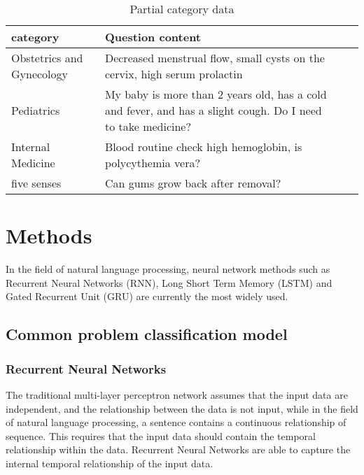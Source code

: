 \documentclass{article}
\begin{document}
\begin{table*}[h!]
    \caption{Partial category data}    
    \centering
    \begin{tabularx}{\textwidth}{lXXX}
            \hline
            category & Question content \\ \hline
            Obstetrics and Gynecology & Decreased menstrual flow, small cysts on the cervix, high serum prolactin \\
            Pediatrics & My baby is more than 2 years old, has a cold and fever, and has a slight cough. Do I need to take medicine?\\
            Internal Medicine & Blood routine check high hemoglobin, is polycythemia vera? \\five senses & Can gums grow back after removal?\\
            \hline
            \end{tabularx}
    \label{tab:2}
\end{table*}

\section{Methods}

In the field of natural language processing, neural network methods such as Recurrent Neural Networks (RNN), Long Short Term Memory (LSTM) and Gated Recurrent Unit (GRU) are currently the most widely used.

\subsection{Common problem classification model}
\subsubsection{Recurrent Neural Networks}
The traditional multi-layer perceptron network assumes that the input data are independent, and the relationship between the data is not input, while in the field of natural language processing, a sentence contains a continuous relationship of sequence. This requires that the input data should contain the temporal relationship within the data. Recurrent Neural Networks are able to capture the internal temporal relationship of the input data.
\end{document}
